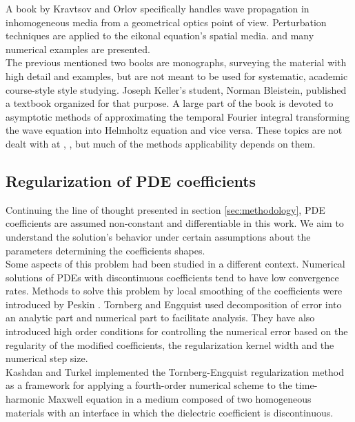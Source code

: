\documentclass[12pt,twoside]{report}
\begin{document}
A book by Kravtsov and Orlov \cite{KravstovOrlov1990} specifically handles wave propagation in inhomogeneous media from a geometrical optics point of view. Perturbation techniques are applied to the eikonal equation's spatial media. and many numerical examples are presented. \\

The previous mentioned two books are monographs, surveying the material with high detail and examples, but are not meant to be used for systematic, academic course-style style studying. Joseph Keller's student, Norman Bleistein, published a textbook \cite{Bleistein1984} organized for that purpose. A large part of the book is devoted to asymptotic methods of approximating the temporal Fourier integral transforming the wave equation into Helmholtz equation and vice versa. These topics are not dealt with at \cite{Keller1995}, \cite{KravstovOrlov1990}, but much  of the methods applicability depends on them. 

\subsection{Regularization of PDE coefficients}
Continuing the line of thought presented in section \ref{sec:methodology}, PDE coefficients are assumed non-constant and differentiable in this work. We aim to understand the solution's behavior under certain assumptions about the parameters determining the coefficients shapes. \\
Some aspects of this problem had been studied in a different context. Numerical solutions of PDEs with discontinuous coefficients tend to have low convergence rates. Methods to solve this problem by local smoothing of the coefficients were introduced by Peskin \cite{Peskin1977, Peskin2002}. Tornberg and Engquist \cite{TornbergEngquist2003} used decomposition of error into an analytic part and numerical part to facilitate analysis. They have also introduced high order conditions for controlling the numerical error based on the regularity of the modified coefficients, the regularization kernel width and the numerical step size.\\
Kashdan and Turkel \cite{KashdanTurkel2006} implemented the Tornberg-Engquist regularization method as a framework for applying a fourth-order numerical scheme to the time-harmonic Maxwell equation in a medium composed of two homogeneous materials with an interface in which the dielectric coefficient is discontinuous.
\end{document}
